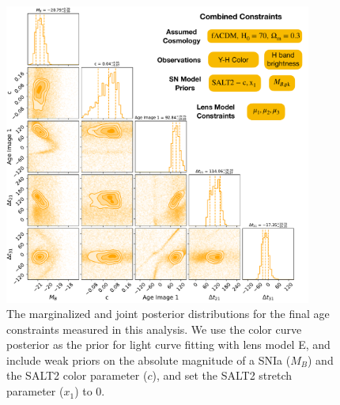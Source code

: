\documentclass[12pt]{article}
\begin{document}
\begin{figure}
    \centering
    \includegraphics[width=0.9\textwidth]{Paper/Figures/lc_modelE_color_corner_labels}
    \caption{The marginalized and joint posterior distributions for the final age constraints measured in this analysis. We use the color curve posterior as the prior for light curve fitting with lens model E, and include weak priors on the absolute magnitude of a SNIa ($M_B$) and the SALT2 color parameter ($c$), and set the SALT2 stretch parameter ($x_1$) to 0.}
    \label{fig:corner_combined}
\end{figure}
\end{document}
